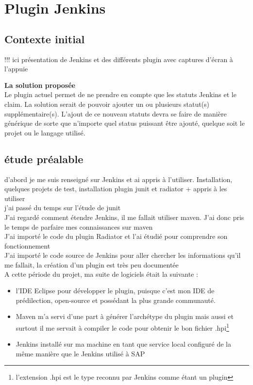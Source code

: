 \chapter{Plugin Jenkins}

\section{Contexte initial}
!!! ici présentation de Jenkins et des différents plugin avec captures d'écran à l'appuie

\textbf{La solution propos\'{e}e} \hfill \\ \indent
Le plugin actuel permet de ne prendre en compte que les statuts Jenkins et le claim. La solution serait de pouvoir ajouter un ou plusieurs statut(s) supplémentaire(s). L'ajout de ce nouveau statuts devra se faire de manière générique de sorte que n'importe quel status puissant être ajouté, quelque soit le projet ou le langage utilisé.



\section{étude préalable}
d'abord je me suis renseigné sur Jenkins et ai appris à l'utiliser. Installation, quelques projets de test, installation plugin junit et radiator + appris à les utiliser\\
j'ai passé du temps sur l'étude de junit\\
J'ai regardé comment étendre Jenkins, il me fallait utiliser maven. J'ai donc pris le temps de parfaire mes connaissances sur maven\\
J'ai importé le code du plugin Radiator et l'ai étudié pour comprendre son fonctionnement\\
J'ai importé le code source de Jenkins pour aller chercher les informations qu'il me fallait, la création d'un plugin est très peu documentée\\

A cette période du projet, ma suite de logiciels était la suivante :
\begin{itemize}
	\item l'IDE Eclipse pour développer le plugin, puisque c'est mon IDE de prédilection, open-source et possédant la plus grande communauté. 
	\item Maven m'a servi d'une part à générer l'archétype du plugin mais aussi et surtout il me servait à compiler le code pour obtenir le bon fichier .hpi\footnote{l'extension .hpi est le type reconnu par Jenkins comme étant un plugin}
	\item Jenkins installé sur ma machine en tant que service local configuré de la même manière que le Jenkins utilisé à SAP
	
\end{itemize}

